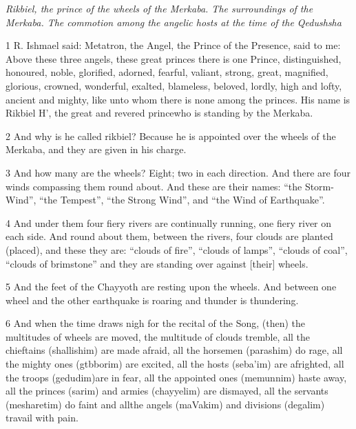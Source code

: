 \par \textit{Rikbiel, the prince of the wheels of the Merkaba. The surroundings of the Merkaba. The commotion among the angelic hosts at the time of the Qedushsha}

\par 1 R. Ishmael said: Metatron, the Angel, the Prince of the Presence, said to me: Above these three angels, these great princes there is one Prince, distinguished, honoured, noble, glorified, adorned, fearful, valiant, strong, great, magnified, glorious, crowned, wonderful, exalted, blameless, beloved, lordly, high and lofty, ancient and mighty, like unto whom there is none among the princes. His name is Rikbiel H', the great and revered princewho is standing by the Merkaba. 

\par 2 And why is he called rikbiel? Because he is appointed over the wheels of the Merkaba, and they are given in his charge.

\par 3 And how many are the wheels? Eight; two in each direction. And there are four winds compassing them round about. And these are their names: “the Storm-Wind”, “the Tempest”, “the Strong Wind”, and “the Wind of Earthquake”.

\par 4 And under them four fiery rivers are continually running, one fiery river on each side. And round about them, between the rivers, four clouds are planted (placed), and these they are: “clouds of fire”, “clouds of lamps”, “clouds of coal”, “clouds of brimstone” and they are standing over against [their] wheels. 

\par 5 And the feet of the Chayyoth are resting upon the wheels. And between one wheel and the other earthquake is roaring and thunder is thundering. 

\par 6 And when the time draws nigh for the recital of the Song, (then) the multitudes of wheels are moved, the multitude of clouds tremble, all the chieftains (shallishim) are made afraid, all the horsemen (parashim) do rage, all the mighty ones (gtbborim) are excited, all the hosts (seba'im) are afrighted, all the troops (gedudim)are in fear, all the appointed ones (memunnim) haste away, all the princes (sarim) and armies (chayyelim) are dismayed, all the servants (mesharetim) do faint and allthe angels (maVakim) and divisions (degalim) travail with pain. 

